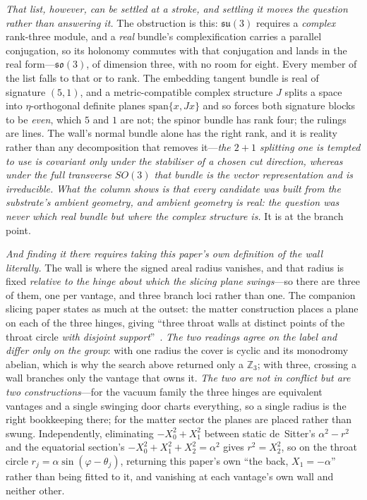 \documentclass[11pt]{article}
\begin{document}
\emph{That list, however, can be settled at a stroke, and settling it moves the question rather than
answering it.} The obstruction is this:
$\mathfrak{su}(3)$ requires a \emph{complex} rank-three module, and a \emph{real} bundle's complexification
carries a parallel conjugation, so its holonomy commutes with that conjugation and lands in the real
form---$\mathfrak{so}(3)$, of dimension three, with no room for eight. Every member of the list falls to that
or to rank. The embedding tangent bundle is real of signature $(5,1)$, and a metric-compatible complex
structure $J$ splits a space into $\eta$-orthogonal definite planes $\mathrm{span}\{x,Jx\}$ and so forces both
signature blocks to be \emph{even}, which $5$ and $1$ are not; the spinor bundle has rank four; the rulings are
lines. The wall's normal bundle alone has the right rank, and it is reality rather than any decomposition that
removes it---\emph{the $2{+}1$ splitting one is tempted to use is covariant only under the stabiliser of a
chosen cut direction, whereas under the full transverse $SO(3)$ that bundle is the vector representation and is
irreducible.} \emph{What the column shows is that every candidate was built from the substrate's ambient
geometry, and ambient geometry is real: the question was never which real bundle but where the complex
structure is.} It is at the branch point.

\emph{And finding it there requires taking this paper's own definition of the wall literally.} The wall is where the signed
areal radius vanishes, and that radius is fixed \emph{relative to the hinge about which the slicing plane
swings}---so there are three of them, one per vantage, and three branch loci rather than one. The companion
slicing paper states as much at the outset: the matter construction places a plane on each of the three hinges,
giving ``three throat walls at distinct points of the throat circle \emph{with disjoint
support}''~\cite{JanzenSlicing}. \emph{The two readings agree on the label and differ
only on the group}: with one radius the cover is cyclic and its monodromy abelian, which is why the search
above returned only a $\mathbb{Z}_3$; with three, crossing a wall branches only the vantage that owns it.
\emph{The two are not in conflict but are two constructions}---for the vacuum family the three hinges are equivalent vantages and a single
swinging door charts everything, so a single radius is the right bookkeeping there; for the matter sector the
planes are placed rather than swung. Independently, eliminating $-X_0^{2}+X_1^{2}$ between static de~Sitter's
$\alpha^{2}-r^{2}$ and the equatorial section's $-X_0^{2}+X_1^{2}+X_2^{2}=\alpha^{2}$ gives $r^{2}=X_2^{2}$, so
on the throat circle $r_j=\alpha\sin(\varphi-\theta_j)$, returning this paper's own ``the back,
$X_1=-\alpha$'' rather than being fitted to it, and vanishing at each vantage's own wall and neither other.
\end{document}
